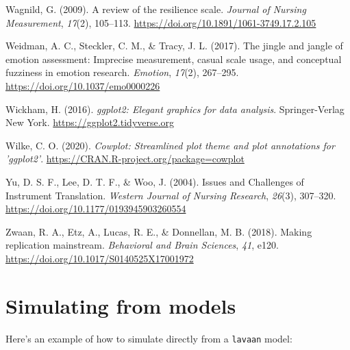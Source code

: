 \documentclass[
  man]{apa7}
\newlength{\cslhangindent}
\newlength{\cslentryspacingunit} %
\newenvironment{CSLReferences}[2] %
 {%
  \setlength{\parindent}{0pt}
  \ifodd #1
  \let\oldpar\par
  \def\par{\hangindent=\cslhangindent\oldpar}
  \fi
  \setlength{\parskip}{#2\cslentryspacingunit}
 }%
 {}
\begin{document}
\begin{CSLReferences}{1}{0}
\leavevmode{}%
Wagnild, G. (2009). A review of the resilience scale. \emph{Journal of Nursing Measurement}, \emph{17}(2), 105--113. \url{https://doi.org/10.1891/1061-3749.17.2.105}

\leavevmode{}%
Weidman, A. C., Steckler, C. M., \& Tracy, J. L. (2017). The jingle and jangle of emotion assessment: Imprecise measurement, casual scale usage, and conceptual fuzziness in emotion research. \emph{Emotion}, \emph{17}(2), 267--295. \url{https://doi.org/10.1037/emo0000226}

\leavevmode{}%
Wickham, H. (2016). \emph{ggplot2: Elegant graphics for data analysis}. Springer-Verlag New York. \url{https://ggplot2.tidyverse.org}

\leavevmode{}%
Wilke, C. O. (2020). \emph{Cowplot: Streamlined plot theme and plot annotations for 'ggplot2'}. \url{https://CRAN.R-project.org/package=cowplot}

\leavevmode{}%
Yu, D. S. F., Lee, D. T. F., \& Woo, J. (2004). Issues and Challenges of Instrument Translation. \emph{Western Journal of Nursing Research}, \emph{26}(3), 307--320. \url{https://doi.org/10.1177/0193945903260554}

\leavevmode{}%
Zwaan, R. A., Etz, A., Lucas, R. E., \& Donnellan, M. B. (2018). Making replication mainstream. \emph{Behavioral and Brain Sciences}, \emph{41}, e120. \url{https://doi.org/10.1017/S0140525X17001972}

\end{CSLReferences}

\newpage

\hypertarget{appendix-appendix}{%
\appendix}


\hypertarget{simulating-from-models}{%
\section{Simulating from models}\label{simulating-from-models}}

Here's an example of how to simulate directly from a \texttt{lavaan} model:

\small
\end{document}
